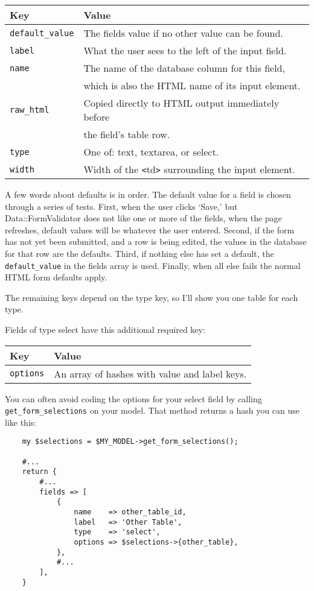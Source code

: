 \begin{tabular}{l|l}
Key & Value \\
\hline
\verb+default_value+ & The fields value if no other value can be found.   \\
\verb+label+         & What the user sees to the left of the input field. \\
\verb+name+          & The name of the database column for this field,    \\
                     & which is also the HTML name of its input element.  \\
\verb+raw_html+      & Copied directly to HTML output immediately before  \\
                     & the field's table row.                             \\
\verb+type+          & One of: text, textarea, or select.                 \\
\verb+width+         & Width of the \verb+<+td\verb+>+ surrounding the
                       input element.   \\
\end{tabular}

A few words about defaults is in order.  The default value for a field
is chosen through a series of tests.  First, when the user clicks `Save,'
but Data::FormValidator does not like one or more of the fields, when the
page refreshes, default values will be whatever the user entered.  Second,
if the form has not yet been submitted, and a row is being edited, the
values in the database for that row are the defaults.  Third, if nothing
else has set a default, the \verb+default_value+ in the fields array is
used.  Finally, when all else fails the normal HTML form defaults apply.

The remaining keys depend on the type key, so I'll show you one table
for each type.

Fields of type select have this additional required key:

\begin{tabular}{l|l}
Key & Value\\
\hline
\verb+options+ & An array of hashes with value and label keys.\\
\end{tabular}

You can often avoid coding the options for your select field by calling
\verb+get_form_selections+ on your model.  That method returns a hash
you can use like this:

\begin{verbatim}
    my $selections = $MY_MODEL->get_form_selections();

    #...
    return {
        #...
        fields => [
            {
                name    => other_table_id,
                label   => 'Other Table',
                type    => 'select',
                options => $selections->{other_table},
            },
            #...
        ],
    }
\end{verbatim}

